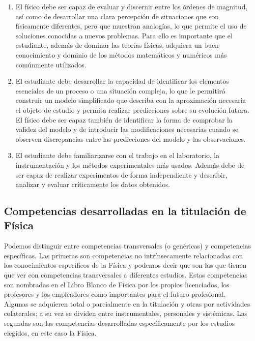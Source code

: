 \begin{enumerate}

\item El físico debe ser capaz de evaluar y discernir entre los órdenes de magnitud, así como de desarrollar una clara percepción de situaciones que son físicamente diferentes, pero que muestran analogías, lo que permite el uso de soluciones conocidas a nuevos problemas. Para ello es importante que el estudiante, además de dominar las teorías físicas, adquiera un buen conocimiento
y dominio de los métodos matemáticos y numéricos más comúnmente utilizados.

\item El estudiante debe desarrollar la capacidad de identificar los elementos esenciales de un proceso o una situación compleja, lo que le permitirá construir un modelo simplificado que describa con la aproximación necesaria el objeto de estudio y permita realizar predicciones sobre su evolución futura. El físico debe ser capaz también de identificar la forma de comprobar la validez del modelo y
de introducir las modificaciones necesarias cuando se observen discrepancias entre las predicciones del modelo y las observaciones.

\item El estudiante debe familiarizarse con el trabajo en el laboratorio, la instrumentación y los métodos experimentales más usados. Además debe de ser capaz de realizar experimentos de forma independiente y describir, analizar y evaluar críticamente los datos obtenidos.

\end{enumerate}


\subsection{Competencias desarrolladas en la titulación de Física} \label{sec:competencias}

Podemos distinguir entre competencias transversales (o genéricas) y competencias específicas. Las primeras son competencias no intrínsecamente relacionadas con los conocimientos específicos de la Física y podemos decir que son las que tienen que ver con competencias transversales a diferentes estudios. Estas competencias son nombradas en el Libro Blanco de Física por los propios licenciados, los profesores y los empleadores como importantes para el
futuro profesional. Algunas se adquieren total o parcialmente en la titulación y otras por actividades colaterales; a su vez se dividen entre instrumentales, personales y sistémicas. Las segundas son las competencias desarrolladas específicamente por los estudios elegidos, en este caso la Física.


